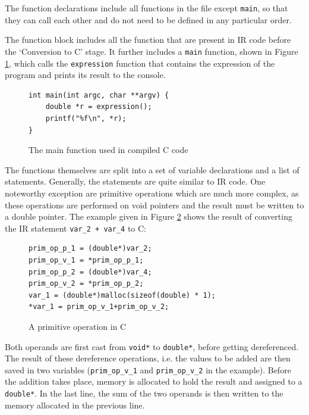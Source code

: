 \documentclass[11pt]{report}
\begin{document}
The function declarations include all functions in the file except \texttt{main}, so that they can call each other and do not need to be defined in any particular order.

The function block includes all the function that are present in IR code before the `Conversion to C' stage. It further includes a \texttt{main} function, shown in Figure \ref{icmm5}, which calls the \texttt{expression} function that contains the expression of the program and prints its result to the console.

\begin{figure}[ht]
\begin{lstlisting}
int main(int argc, char **argv) {
    double *r = expression();
    printf("%f\n", *r);
}
\end{lstlisting}
\caption{The main function used in compiled C code}
\label{icmm5}
\end{figure}

The functions themselves are split into a set of variable declarations and a list of statements. Generally, the statements are quite similar to IR code. One noteworthy exception are primitive operations which are much more complex, as these operations are performed on void pointers and the result must be written to a double pointer. The example given in Figure \ref{icmm6} shows the result of converting the IR statement \texttt{var_2 + var_4} to C:

\begin{figure}[ht]
\begin{lstlisting}
prim_op_p_1 = (double*)var_2;
prim_op_v_1 = *prim_op_p_1;
prim_op_p_2 = (double*)var_4;
prim_op_v_2 = *prim_op_p_2;
var_1 = (double*)malloc(sizeof(double) * 1);
*var_1 = prim_op_v_1+prim_op_v_2;
\end{lstlisting}
\caption{A primitive operation in C}
\label{icmm6}
\end{figure}

Both operands are first cast from \texttt{void*} to \texttt{double*}, before getting dereferenced. The result of these dereference operations, i.e. the values to be added are then saved in two variables (\texttt{prim_op_v_1} and \texttt{prim_op_v_2} in the example). Before the addition takes place, memory is allocated to hold the result and assigned to a \texttt{double*}. In the last line, the sum of the two operands is then written to the memory allocated in the previous line.
\end{document}

